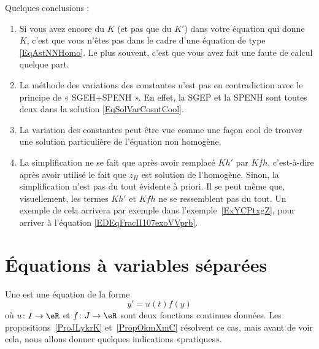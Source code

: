 Quelques conclusions :

\begin{enumerate}
	\item
	      Si vous avez encore du \( K\) (et pas que du \( K'\)) dans votre équation qui donne \( K\), c'est que vous n'êtes pas dans le cadre d'une équation de type \eqref{EqAstNNHomo}. Le plus souvent, c'est que vous avez fait une faute de calcul quelque part.

	\item
	      La méthode des variations des constantes n'est pas en contradiction avec le principe de « SGEH+SPENH ». En effet, la SGEP et la SPENH sont toutes deux dans la solution \eqref{EqSolVarCosntCool}.

	\item
	      La variation des constantes peut être vue comme une façon cool de trouver une solution particulière de l'équation non homogène.

	\item
	      La simplification ne se fait que après avoir remplacé \( Kh'\) par \( Kfh\), c'est-à-dire après avoir utilisé le fait que \( z_H\) est solution de l'homogène. Sinon, la simplification n'est pas du tout évidente à priori. Il se peut même que, visuellement, les termes \( Kh'\) et \( Kfh\) ne se ressemblent pas du tout. Un exemple de cela arrivera par exemple dans l'exemple~\ref{ExYCPtxgZ}, pour arriver à l'équation \eqref{EDEqFracII107exoVVprb}.

\end{enumerate}


\section{Équations à variables séparées}
\label{Secvarsep}

Une  est une équation  de la forme
\begin{equation}		\label{EqDiffSeparee}
	y'=u(t)f(y)
\end{equation}
où \( u\colon I\to \eR\) et \( f\colon J\to \eR\) sont deux fonctions continues données. Les propositions~\ref{ProJLykrK} et~\ref{PropOkmXmC} résolvent ce cas, mais avant de voir cela, nous allons donner quelques indications «pratiques».

